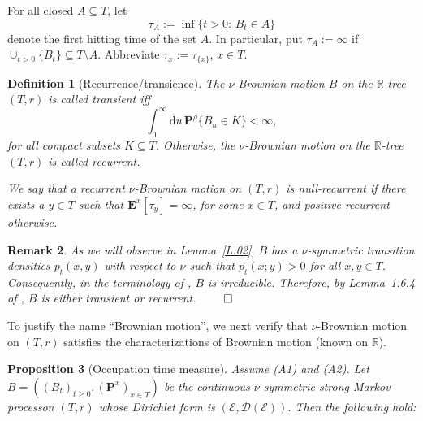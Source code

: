\documentclass[11pt]{amsart}
\numberwithin{equation}{section}
\newtheorem{definition}{Definition}[section]
\newtheorem{proposition}[definition]{Proposition}
\newtheorem{remark}[definition]{Remark}
\begin{document}
For all closed $A\subseteq T$, let
\begin{equation}\label{tauA}
   \tau_A
 :=
   \inf\big\{t  > 0:\,B_t\in A\big\}
\end{equation}
denote the {{\it} first hitting time} of the set $A$. In particular, put $\tau_A:=\infty$ if $\cup_{t > 0}\{B_t\}\subseteq T\setminus A$. Abbreviate $\tau_x:=\tau_{\{x\}}$, $x\in T$.
\begin{definition}[Recurrence/transience]
The   $\nu$-Brownian motion $B$ on the ${{\mathbb R}}$-tree $(T,r)$
is called {\rm transient} iff
\begin{equation}\label{e:013}
 \int_0^\infty\mathrm{d}u\,\mathbf P^{\rho}\{B_u \in K \}<\infty,
\end{equation}
for all compact subsets $K\subseteq T$.
Otherwise, the   $\nu$-Brownian motion on the ${{\mathbb R}}$-tree $(T,r)$ is called {\rm recurrent}.

We say that a recurrent $\nu$-Brownian motion on $(T,r)$ is {\rm null-recurrent} if there exists a $y\in T$ such that $\mathbf E^x[\tau_y]=\infty$, for some $x\in T$, and {\rm positive recurrent} otherwise.
\label{Def:04}
\end{definition}{\smallskip}

{
\begin{remark}\rm As we will observe in Lemma~\ref{L:02}, $B$ has a $\nu$-symmetric transition densities $p_t(x,y)$ with respect
to $\nu$ such that $p_t(x;y) > 0$ for all $x, y\in T$. Consequently, in the terminology
of \cite{FukushimaOshimaTakeda1994}, $B$ is irreducible. Therefore, by Lemma~1.6.4 of \cite{FukushimaOshimaTakeda1994}, $B$ is either
transient or recurrent.
\hfill$\qed$
\end{remark}{\smallskip}
}

To justify the name ``Brownian motion'', we
next  verify that $\nu$-Brownian motion on $(T,r)$ satisfies  the  characterizations of Brownian motion  (known  on ${{\mathbb R}}$).

\begin{proposition}[Occupation time measure]
Assume (A1) and (A2). Let $B=((B_t)_{t\ge 0},({\mathbf P}^x)_{x\in T})$ be the continuous $\nu$-symmetric strong Markov process\label{P:prop}
 on $(T,r)$
whose Dirichlet form is $({\mathcal E}, {\mathcal D}({\mathcal E}))$.
Then the following hold:
\end{proposition}{\smallskip}
\end{document}
